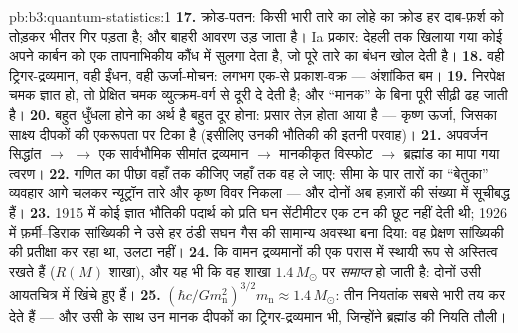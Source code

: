 \begin{solution}{pb:b3:quantum-statistics:1}
\textbf{17.} क्रोड-पतन: किसी भारी तारे का लोहे का क्रोड हर दाब-फ़र्श
को तोड़कर भीतर गिर पड़ता है; और बाहरी आवरण उड़ जाता है। Ia प्रकार:
देहली तक खिलाया गया कोई  अपने कार्बन को एक
तापनाभिकीय कौंध में सुलगा देता है, जो पूरे तारे का बंधन खोल देती है।
\textbf{18.} वही ट्रिगर-द्रव्यमान, वही ईंधन, वही ऊर्जा-मोचन:
लगभग एक-से प्रकाश-वक्र --- अंशांकित बम।
\textbf{19.} निरपेक्ष चमक ज्ञात हो, तो प्रेक्षित
चमक व्युत्क्रम-वर्ग से दूरी दे देती है; और ``मानक'' के बिना पूरी
सीढ़ी ढह जाती है।
\textbf{20.} बहुत धुँधला होने का अर्थ है बहुत दूर होना: प्रसार
तेज़ होता आया है --- कृष्ण ऊर्जा, जिसका साक्ष्य दीपकों की
एकरूपता पर टिका है (इसीलिए उनकी भौतिकी की इतनी परवाह)।
\textbf{21.} अपवर्जन सिद्धांत $\to$  $\to$ एक
सार्वभौमिक सीमांत द्रव्यमान $\to$ मानकीकृत विस्फोट $\to$
ब्रह्मांड का मापा गया त्वरण।
\textbf{22.} गणित का पीछा वहाँ तक कीजिए जहाँ तक वह ले जाए: सीमा
के पार तारों का ``बेतुका'' व्यवहार आगे चलकर न्यूट्रॉन तारे और
कृष्ण विवर निकला --- और दोनों अब हज़ारों की संख्या में सूचीबद्ध हैं।
\textbf{23.} 1915 में कोई ज्ञात भौतिकी पदार्थ को प्रति घन
सेंटीमीटर एक टन की छूट नहीं देती थी; 1926 में फ़र्मी--डिराक
सांख्यिकी ने उसे हर ठंडी सघन गैस की सामान्य अवस्था बना दिया: वह
प्रेक्षण सांख्यिकी की प्रतीक्षा कर रहा था, उलटा नहीं।
\textbf{24.} कि वामन द्रव्यमानों की एक परास में स्थायी रूप से
अस्तित्व रखते हैं ($R(M)$ शाखा), और यह भी कि वह शाखा
$1.4\,M_\odot$ पर \emph{समाप्त} हो जाती है: दोनों उसी आयतचित्र में
खिंचे हुए हैं।
\textbf{25.} $(\hbar c/Gm_{\text{n}}^2)^{3/2}m_{\text{n}} \approx
1.4\,M_\odot$: तीन नियतांक सबसे भारी  तय कर देते हैं ---
और उसी के साथ उन मानक दीपकों का ट्रिगर-द्रव्यमान भी, जिन्होंने
ब्रह्मांड की नियति तौली।
\end{solution}
